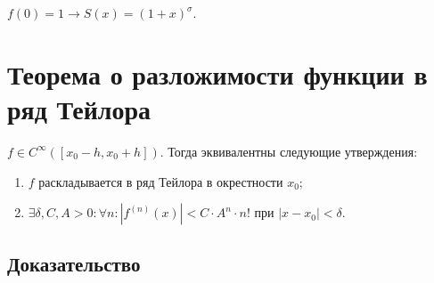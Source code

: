\documentclass{article}
\begin{document}
            $f(0) = 1 \rightarrow S(x) = (1 + x)^{\sigma}$.
            
    \newpage
    
    \section{Теорема о разложимости функции в ряд Тейлора}
    
        $f \in C^{\infty} \left( [x_0 - h, x_0 + h] \right)$. Тогда эквивалентны следующие утверждения:
        
        \begin{enumerate}
        
            \item $f$ раскладывается в ряд Тейлора в окрестности $x_0$;
            
            \item $\exists \delta, C, A > 0 : \forall n : \left| f^{(n)}(x) \right| < C \cdot A^n \cdot n!$ при $|x - x_0| < \delta$.
            
        \end{enumerate}
        
        \subsection{Доказательство}
        
\end{document}
